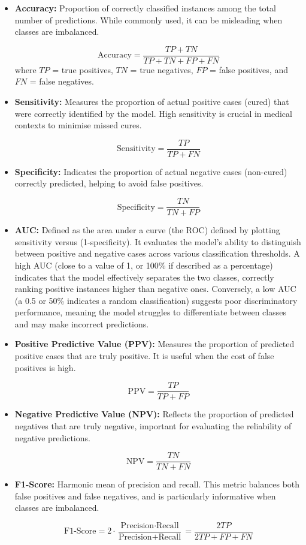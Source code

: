 \documentclass[12pt, a4paper]{report}
\begin{document}
\begin{itemize}
    \item \textbf{Accuracy:} Proportion of correctly classified instances among the total number of predictions. While commonly used, it can be misleading when classes are imbalanced.

    \[
    \text{Accuracy} = \frac{TP + TN}{TP + TN + FP + FN}
    \]
    where $TP$ = true positives, $TN$ = true negatives, $FP$ = false positives, and $FN$ = false negatives.

    
    \item \textbf{Sensitivity:} Measures the proportion of actual positive cases (cured) that were correctly identified by the model. High sensitivity is crucial in medical contexts to minimise missed cures.

    \[
    \text{Sensitivity} = \frac{TP}{TP + FN}
    \]

    \item \textbf{Specificity:} Indicates the proportion of actual negative cases (non-cured) correctly predicted, helping to avoid false positives.

    \[
    \text{Specificity} = \frac{TN}{TN + FP}
    \]

\item \textbf{AUC:} Defined as the area under a curve (the ROC) defined by plotting sensitivity versus (1-specificity). It evaluates the model’s ability to distinguish between positive and negative cases across various classification thresholds. A high AUC (close to a value of 1, or 100\% if described as a percentage) indicates that the model effectively separates the two classes, correctly ranking positive instances higher than negative ones. Conversely, a low AUC (a 0.5 or 50\% indicates a random classification) suggests poor discriminatory performance, meaning the model struggles to differentiate between classes and may make incorrect predictions.

    \item \textbf{Positive Predictive Value (PPV):} Measures the proportion of predicted positive cases that are truly positive. It is useful when the cost of false positives is high.

    \[
    \text{PPV} = \frac{TP}{TP + FP}
    \]

    \item \textbf{Negative Predictive Value (NPV):} Reflects the proportion of predicted negatives that are truly negative, important for evaluating the reliability of negative predictions.

    \[
    \text{NPV} = \frac{TN}{TN + FN}
    \]

    \item \textbf{F1-Score:} Harmonic mean of precision and recall. This metric balances both false positives and false negatives, and is particularly informative when classes are imbalanced.

    \[
    \text{F1-Score} = 2 \cdot \frac{\text{Precision} \cdot \text{Recall}}{\text{Precision} + \text{Recall}} = \frac{2TP}{2TP + FP + FN}
    \]
\end{itemize}
\end{document}
